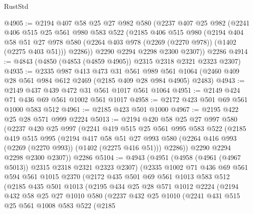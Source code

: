 \begin{lexlean}{RustStd}
\begin{coremodule}
@4905 := @2194
    @407
    @58
    @25
    @27
    @982
    @580
    (@2237
      @407
      @25
      @982
      (@2241
        @406
        @515
        @25
        @561
        @980
        @583
        @522
        (@2185
          @406
          @515
          @980
          (@2194
            @404
            @58
            @51
            @27
            @978
            @580
            (@2264 @403 @978 (@2269 (@2270 @978)) (@1402 (@2275 @403 @51)))
            @2286))
        @2290
        @2294
        @2298
        @2300
        @2307))
    @2286
@4914 := @4843 (@4850 (@4853 (@4859 @4905)) @2315 @2318 @2321 @2323 @2307)
@4935 := @2335
    @987
    @413
    @473
    @31
    @561
    @989
    @561
    @1064
    (@2460 @409 @28 @561 @984 @612 @2469 (@2185 @409 @28 @984 @4905) @2483)
@4943 := @2149 @437 @439 @472 @31 @561 @1017 @561 @1064
@4951 := @2149 @424 @71 @436 @69 @561 @1002 @561 @1017
@4958 := @2172 @423 @501 @69 @561 @1000 @583 @512
@4961 := @2185 @423 @501 @1000
@4967 := @2195 @422 @25 @28 @571 @999 @2224
@5013 := @2194
    @420
    @58
    @25
    @27
    @997
    @580
    (@2237
      @420
      @25
      @997
      (@2241
        @419
        @515
        @25
        @561
        @995
        @583
        @522
        (@2185
          @419
          @515
          @995
          (@2194
            @417
            @58
            @51
            @27
            @993
            @580
            (@2264 @416 @993 (@2269 (@2270 @993)) (@1402 (@2275 @416 @51)))
            @2286))
        @2290
        @2294
        @2298
        @2300
        @2307))
    @2286
@5104 := @4943
    (@4951
      (@4958 (@4961 (@4967 @5013)) @2315 @2318 @2321 @2323 @2307)
      (@2335
        @1002
        @71
        @436
        @69
        @561
        @594
        @561
        @1015
        @2370
        (@2172
          @435
          @501
          @69
          @561
          @1013
          @583
          @512
          (@2185
            @435
            @501
            @1013
            (@2195
              @434
              @25
              @28
              @571
              @1012
              @2224
              (@2194
                @432
                @58
                @25
                @27
                @1010
                @580
                (@2237
                  @432
                  @25
                  @1010
                  (@2241
                    @431
                    @515
                    @25
                    @561
                    @1008
                    @583
                    @522
                    (@2185

\end{coremodule}
\end{lexlean}
